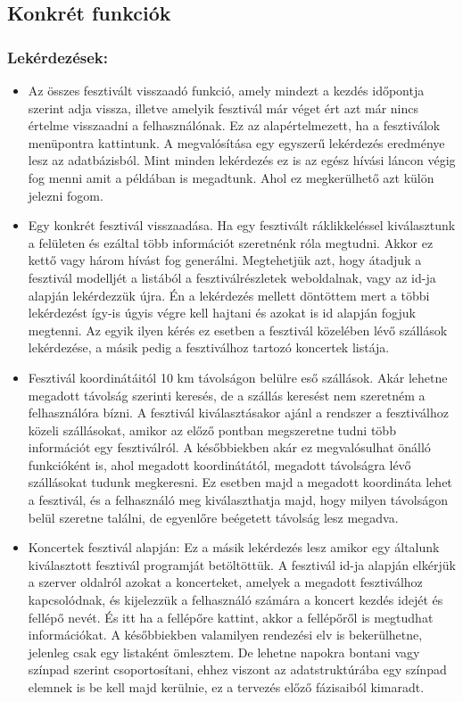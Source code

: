 \subsection{Konkrét funkciók}

\subsubsection{Lekérdezések:}
\begin{itemize}
\item Az összes fesztivált visszaadó funkció, amely mindezt a kezdés időpontja szerint adja vissza, illetve amelyik fesztivál már véget ért azt már nincs értelme visszaadni a felhasználónak. Ez az alapértelmezett, ha a fesztiválok menüpontra kattintunk. A megvalósítása egy egyszerű lekérdezés eredménye lesz az adatbázisból. Mint minden lekérdezés ez is az egész hívási láncon végig fog menni amit a példában is megadtunk. Ahol ez megkerülhető azt külön jelezni fogom.
 
\item Egy konkrét fesztivál visszaadása. Ha egy fesztivált ráklikkeléssel kiválasztunk a felületen és ezáltal több információt szeretnénk róla megtudni. Akkor ez kettő vagy három hívást fog generálni. Megtehetjük azt, hogy átadjuk a fesztivál modelljét a listából a fesztiválrészletek weboldalnak, vagy az id-ja alapján lekérdezzük újra. Én a lekérdezés mellett döntöttem mert a többi lekérdezést így-is úgyis végre kell hajtani és azokat is id alapján fogjuk megtenni. Az egyik ilyen kérés ez esetben a fesztivál közelében lévő szállások lekérdezése, a másik pedig a fesztiválhoz tartozó koncertek listája.   

\item Fesztivál koordinátáitól 10 km távolságon belülre eső szállások. Akár lehetne megadott távolság szerinti keresés, de a szállás keresést nem szeretném a felhasználóra bízni. A fesztivál kiválasztásakor ajánl a rendszer a fesztiválhoz közeli szállásokat, amikor az előző pontban megszeretne tudni több információt egy fesztiválról. A későbbiekben akár ez megvalósulhat önálló funkcióként is, ahol megadott koordinátától, megadott távolságra lévő szállásokat tudunk megkeresni. Ez esetben majd a megadott koordináta lehet a fesztivál, és a felhasználó meg kiválaszthatja majd, hogy milyen távolságon belül szeretne találni, de egyenlőre beégetett távolság lesz megadva.

\item Koncertek fesztivál alapján: Ez a másik lekérdezés lesz amikor egy általunk kiválasztott fesztivál programját betöltöttük. A fesztivál id-ja alapján elkérjük a szerver oldalról azokat a koncerteket, amelyek a megadott fesztiválhoz kapcsolódnak, és kijelezzük a felhasználó számára a koncert kezdés idejét és fellépő nevét. És itt ha a fellépőre kattint, akkor a fellépőről is megtudhat információkat. A későbbiekben valamilyen rendezési elv is bekerülhetne, jelenleg csak egy listaként ömlesztem. De lehetne napokra bontani vagy színpad szerint csoportosítani, ehhez viszont az adatstruktúrába egy színpad elemnek is be kell majd kerülnie, ez a tervezés előző fázisaiból kimaradt.


\end{itemize}
